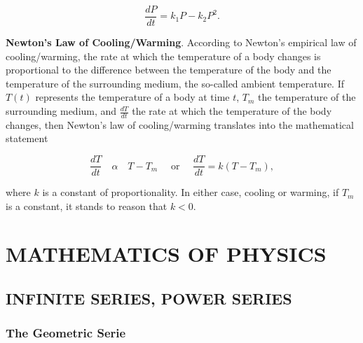 \documentclass[12pt]{report}
\begin{document}
		\begin{equation}
			\frac{dP}{dt} = k_1P - k_2P^2.
		\end{equation}

		\par \textbf{Newton’s Law of Cooling/Warming}. According to Newton’s empirical law of cooling/warming, the rate at which the temperature of a body changes is proportional to the difference between the temperature of the body and the temperature of the surrounding medium, the so-called ambient temperature. If $T(t)$ represents the temperature of a body at time $t$, $T_m$ the temperature of the surrounding medium, and $\frac{dT}{dt}$ the rate at which the temperature of the body changes, then Newton’s law of cooling/warming translates into the mathematical statement

		\begin{equation}\label{eq:CoolWarm}
			\frac{dT}{dt} \quad\alpha\quad T - T_m \quad\text{ or }\quad \frac{dT}{dt} = k (T- T_m),
		\end{equation}

		where $k$ is a constant of proportionality. In either case, cooling or warming, if $T_m$ is a constant, it stands to reason that $k < 0$.


\part{MATHEMATICS OF PHYSICS}

\chapter{INFINITE SERIES, POWER SERIES}

\section{The Geometric Serie}
\end{document}
